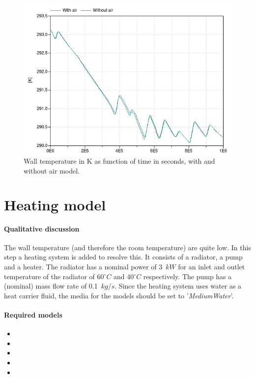 \documentclass[10pt,a4paper]{article}
\begin{document}
\begin{figure}
\centering
\includegraphics[scale=0.6]{result3.png}
\caption{Wall temperature in K as function of time in seconds,
with and without air model.}
\label{fig:res3}
\end{figure}


\section{Heating model}
\paragraph{Qualitative discussion}
The wall temperature (and therefore the room temperature) are quite low. 
In this step a heating system is added to resolve this.
It consists of a radiator, a pump and a heater.
The radiator has a nominal power of 3~$kW$ for an inlet and outlet temperature of the radiator of 60$^{\circ}C$ and 40$^{\circ}C$ respectively.
The pump has a (nominal) mass flow rate of 0.1~$kg/s$.
Since the heating system uses water as a heat carrier fluid, 
the media for the models should be set to '\textit{MediumWater}'.

\paragraph{Required models}
\begin{itemize}
\item {}
\item {}
\item {}
\item {}
\item {}
\end{itemize}
\end{document}
